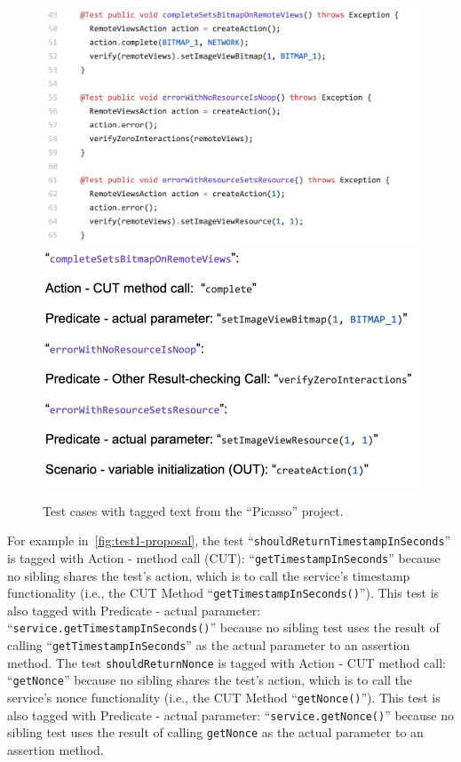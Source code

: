 \begin{figure}[t]
\centering
\includegraphics[scale=0.45]{figures/sp4-proposal.png}
\includegraphics[scale=0.45]{figures/sp2-proposal.png}
\caption{Test cases with tagged text from the \enquote{Picasso} project.}
\label{fig:test2-proposal}
\end{figure}

For example in~\cref{fig:test1-proposal}, the test \enquote{\texttt{shouldReturnTimestampInSeconds}} is tagged with Action - method call (CUT): \enquote{\texttt{getTimestampInSeconds}} because no sibling shares the test’s action, which is to call the service’s timestamp functionality (i.e., the CUT Method \enquote{\texttt{getTimestampInSeconds()}}).
%
This test is also tagged with Predicate - actual parameter: \enquote{\texttt{service.getTimestampInSeconds()}} because no sibling test uses the result of calling \enquote{\texttt{getTimestampInSeconds}} as the actual parameter to an assertion method.
%
The test \texttt{shouldReturnNonce} is tagged with Action - CUT method call: \enquote{\texttt{getNonce}} because no sibling shares the test’s action, which is to call the service’s nonce functionality (i.e., the CUT Method \enquote{\texttt{getNonce()}}).
%
This test is also tagged with Predicate - actual parameter: \enquote{\texttt{service.getNonce()}} because no sibling test uses the result of calling \texttt{getNonce} as the actual parameter to an assertion method.

